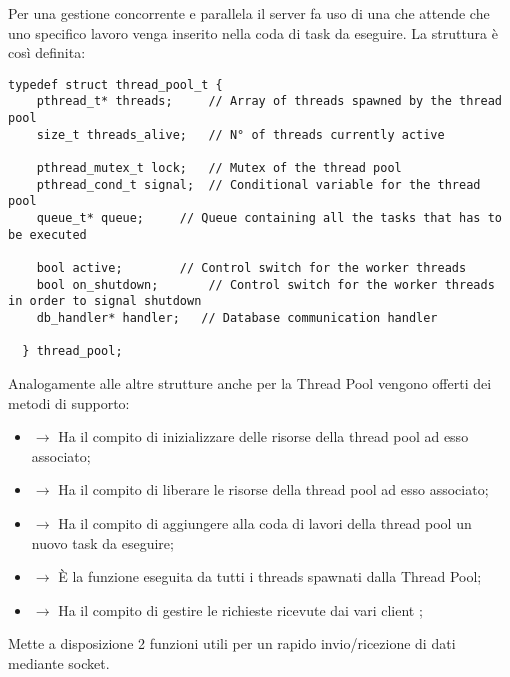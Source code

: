   \begin{center}  \end{center}
  Per una gestione concorrente e parallela il server fa uso di una \href{https://it.wikipedia.org/wiki/Thread_pool}{} che attende che uno specifico lavoro venga inserito nella coda di task da eseguire. La struttura è così definita:

  \begin{lstlisting}[language={[POSIX]C}, style=wnumbers]
  typedef struct thread_pool_t {
    pthread_t* threads;		// Array of threads spawned by the thread pool
    size_t threads_alive;	// N° of threads currently active

    pthread_mutex_t lock;	// Mutex of the thread pool
    pthread_cond_t signal;	// Conditional variable for the thread pool
    queue_t* queue;		// Queue containing all the tasks that has to be executed

    bool active;		// Control switch for the worker threads
    bool on_shutdown;		// Control switch for the worker threads in order to signal shutdown
    db_handler* handler;   // Database communication handler

  } thread_pool;
  \end{lstlisting}
  Analogamente alle altre strutture anche per la Thread Pool vengono offerti dei metodi di supporto:

  \begin{itemize}
    \item {} $\rightarrow$ Ha il compito di inizializzare delle risorse della thread pool ad esso associato;
    \item {} $\rightarrow$ Ha il compito di liberare le risorse della thread pool ad esso associato;
    \item {} $\rightarrow$ Ha il compito di aggiungere alla coda di lavori della thread pool un nuovo task da eseguire;
    \item {} $\rightarrow$ È la funzione eseguita da tutti i threads spawnati dalla Thread Pool;
    \item {} $\rightarrow$ Ha il compito di gestire le richieste ricevute dai vari client \footnotemark {} ;
  \end{itemize}

  \begin{center}  \end{center}
  Mette a disposizione 2 funzioni utili per un rapido invio/ricezione di dati mediante socket.

